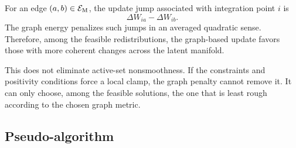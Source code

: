 \documentclass[11pt,a4paper]{article}
\begin{document}
For an edge $(a,b)\in\mathcal{E}_{\mathrm{M}}$, the update jump associated with integration point
$i$ is
\[
        \Delta W_{ia}-\Delta W_{ib}.
\]
The graph energy penalizes such jumps in an averaged quadratic sense. Therefore,
among the feasible redistributions, the graph-based update favors those with
more coherent changes across the latent manifold.

This does not eliminate active-set nonsmoothness. If the constraints and
positivity conditions force a local clamp, the graph penalty cannot remove it.
It can only choose, among the feasible solutions, the one that is least rough
according to the chosen graph metric.

\subsection{Pseudo-algorithm}
\end{document}
